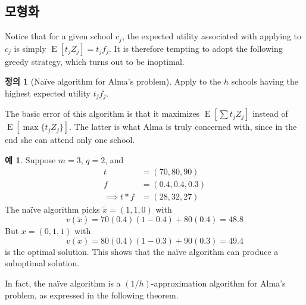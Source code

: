 \documentclass[12pt]{article} %
\newif\ifEN
\theoremstyle{definition}
\newtheorem{example}{Example}
\newtheorem{definition}{Definition}
\theoremstyle{definition}
\newtheorem{example}{예}
\newtheorem{definition}{정의}
\begin{document}
\ifEN \subsection{Na\"ive solution}  \else \subsection{모형화} \fi
Notice that for a given school $c_j$, the expected utility associated with applying to $c_j$ is simply $\operatorname{E}[t_j Z_j] = t_j f_j$. It is therefore tempting to adopt the following greedy strategy, which turns out to be inoptimal.
\begin{definition}[Na\"ive algorithm for Alma’s problem] \label{naivealgorithm}
Apply to the $h$ schools having the highest expected utility $t_j f_j$.
\end{definition}
The basic error of this algorithm is that it maximizes $\operatorname{E}\left[\sum t_j Z_j \right]$ instead of $\operatorname{E}\left[\max \{t_j Z_j\} \right]$. The latter is what Alma is truly concerned with, since in the end she can attend only one school.
\begin{example}
Suppose $m=3$, $q=2$, and
\begin{align*}
t &= (70, 80, 90) \\
f &= (0.4, 0.4, 0.3) \\
\implies t * f &= (28, 32, 27)
\end{align*}
The na\"ive algorithm picks $\tilde x = (1, 1, 0)$ with 
\[v(\tilde x) = 70(0.4)(1-0.4) + 80(0.4) = 48.8\]
But $x = (0, 1, 1)$ with
\[v(x) = 80(0.4)(1-0.3) + 90(0.3) = 49.4\]
is the optimal solution. This shows that the na\"ive algorithm can produce a suboptimal solution.
\end{example}

In fact, the na\"ive algorithm is a $(1/h)$-approximation algorithm for Alma’s problem, as expressed in the following theorem.
\end{document}
